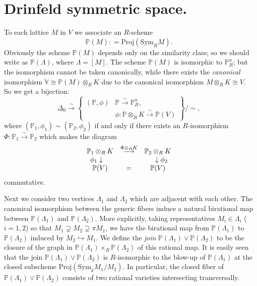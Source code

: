 %
\section{Drinfeld symmetric space.} 
%

To each lattice $M$ in $V$ we associate an $R$-scheme
$$
\mathbb{P}(M)\colon=\mathrm{Proj}(\mathrm{Sym}_RM).
$$
Obviously the scheme $\mathbb{P}(M)$ depends only on the similarity
class; so we should write as $\mathbb{P}(\Lambda)$, where $\Lambda=[M]$.
The scheme $\mathbb{P}(M)$ is isomorphic to $\mathbb{P}^n_R$; but the
isomorphism cannot be taken canonically, while there exists the
{\it canonical} isomorphism $\mathbb{V}\cong\mathbb{P}(M)\otimes_RK$ 
due to the canonical isomorphism $M\otimes_RK\cong V$.
So we get a bijection:
$$
\Delta_0\stackrel{\sim}{\longrightarrow}\left\{
\begin{array}{c|l}
(\mathbb{P},\phi) &\mathbb{P}\stackrel{\sim}{\rightarrow}\mathbb{P}^n_R,\\
&\phi\colon\mathbb{P}\otimes_RK\stackrel{\sim}{\rightarrow}\mathbb{P}(V)
\end{array}
\right\}/\sim,
$$
where $(\mathbb{P}_1,\phi_1)\sim(\mathbb{P}_2,\phi_2)$ if and only if
there exists an $R$-isomorphism
$\Phi\colon\mathbb{P}_1\stackrel{\sim}{\rightarrow}\mathbb{P}_2$
which makes the diagram 
$$
\begin{array}{ccc}
\mathbb{P}_1\otimes_RK&\stackrel{\Phi\otimes_R K}
{\longrightarrow}&\mathbb{P}_2\otimes_RK\\
\llap{$\phi_1$}\downarrow&&\downarrow\rlap{$\phi_2$}\\
\mathbb{P}(V)&=&\mathbb{P}(V)
\end{array}
$$
commutative.

Next we consider two vertices $\Lambda_1$ and $\Lambda_2$ which are 
adjacent with each other.
The canonical isomorphism between the generic fibers induce a natural
birational map between $\mathbb{P}(\Lambda_1)$ and 
$\mathbb{P}(\Lambda_2)$.
More explicitly, taking representatives $M_i\in\Lambda_i$ ($i=1,2$) so
that $M_1\supsetneq M_2\supsetneq\pi M_1$, we have the birational map
from $\mathbb{P}(\Lambda_1)$ to $\mathbb{P}(\Lambda_2)$ induced by
$M_2\hookrightarrow M_1$.
We define the {\it join}
$\mathbb{P}(\Lambda_1)\vee\mathbb{P}(\Lambda_2)$ to be the closure of
the graph in $\mathbb{P}(\Lambda_1)\times_R\mathbb{P}(\Lambda_2)$ of
this rational map.
It is easily seen that the join 
$\mathbb{P}(\Lambda_1)\vee\mathbb{P}(\Lambda_2)$ is $R$-isomorphic to
the blow-up of $\mathbb{P}(\Lambda_1)$ at the closed subscheme 
$\mathrm{Proj}(\mathrm{Sym}_kM_1/M_2)$.
In particular, the closed fiber of 
$\mathbb{P}(\Lambda_1)\vee\mathbb{P}(\Lambda_2)$ consists of two
rational varieties intersecting transversally.


